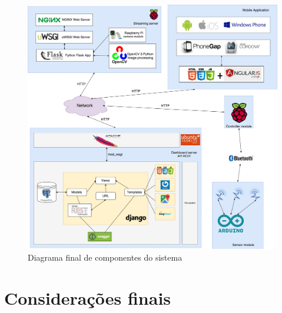 \begin{figure}[!htb]
	\centering
	\includegraphics[width=\linewidth]{esquemas/arquitetura-final.pdf}
	\caption{Diagrama final de componentes do sistema}
	\label{componentesall}
\end{figure}








\newpage








\section{Considerações finais}